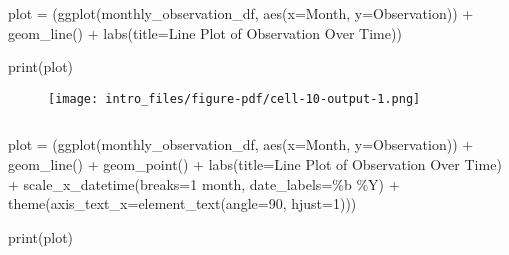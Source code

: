 \documentclass[
  letterpaper,
  DIV=11,
  numbers=noendperiod]{scrreprt}
\newenvironment{Shaded}{\begin{snugshade}}{\end{snugshade}}
\newcommand{\BuiltInTok}[1]{\textcolor[rgb]{0.00,0.23,0.31}{#1}}
\newcommand{\DecValTok}[1]{\textcolor[rgb]{0.68,0.00,0.00}{#1}}
\newcommand{\NormalTok}[1]{\textcolor[rgb]{0.00,0.23,0.31}{#1}}
\newcommand{\OperatorTok}[1]{\textcolor[rgb]{0.37,0.37,0.37}{#1}}
\newcommand{\StringTok}[1]{\textcolor[rgb]{0.13,0.47,0.30}{#1}}
\begin{document}
\begin{Shaded}
\begin{Highlighting}[]
\NormalTok{plot }\OperatorTok{=}\NormalTok{ (ggplot(monthly\_observation\_df, aes(x}\OperatorTok{=}\StringTok{\textquotesingle{}Month\textquotesingle{}}\NormalTok{, y}\OperatorTok{=}\StringTok{\textquotesingle{}Observation\textquotesingle{}}\NormalTok{)) }\OperatorTok{+}
\NormalTok{        geom\_line() }\OperatorTok{+}
\NormalTok{        labs(title}\OperatorTok{=}\StringTok{\textquotesingle{}Line Plot of Observation Over Time\textquotesingle{}}\NormalTok{))}

\BuiltInTok{print}\NormalTok{(plot)}
\end{Highlighting}
\end{Shaded}

\begin{figure}[H]

{\centering \texttt{[image: intro\_files/figure-pdf/cell-10-output-1.png]}

}

\end{figure}

\begin{verbatim}
\end{verbatim}

\begin{Shaded}
\begin{Highlighting}[]
\NormalTok{plot }\OperatorTok{=}\NormalTok{ (ggplot(monthly\_observation\_df, aes(x}\OperatorTok{=}\StringTok{\textquotesingle{}Month\textquotesingle{}}\NormalTok{, y}\OperatorTok{=}\StringTok{\textquotesingle{}Observation\textquotesingle{}}\NormalTok{)) }\OperatorTok{+}
\NormalTok{        geom\_line() }\OperatorTok{+}
\NormalTok{        geom\_point() }\OperatorTok{+}
\NormalTok{        labs(title}\OperatorTok{=}\StringTok{\textquotesingle{}Line Plot of Observation Over Time\textquotesingle{}}\NormalTok{) }\OperatorTok{+} 
\NormalTok{        scale\_x\_datetime(breaks}\OperatorTok{=}\StringTok{\textquotesingle{}1 month\textquotesingle{}}\NormalTok{,  date\_labels}\OperatorTok{=}\StringTok{\textquotesingle{}\%b \%Y\textquotesingle{}}\NormalTok{) }\OperatorTok{+} 
\NormalTok{        theme(axis\_text\_x}\OperatorTok{=}\NormalTok{element\_text(angle}\OperatorTok{=}\DecValTok{90}\NormalTok{, hjust}\OperatorTok{=}\DecValTok{1}\NormalTok{)))}

\BuiltInTok{print}\NormalTok{(plot)}
\end{Highlighting}
\end{Shaded}
\end{document}

